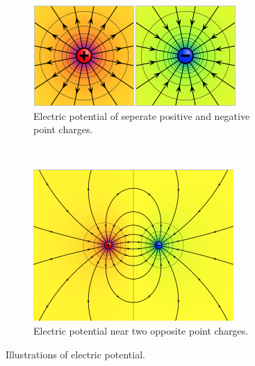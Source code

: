 \begin{figure}
	\centering
	\begin{subfigure}[b]{\linewidth}
		\centering
		\includegraphics[width=\linewidth]{Materials/wiki1}
		\caption{Electric potential of seperate positive and negative point charges.}
		\label{wiki1}
	\end{subfigure}
	\\
	\begin{subfigure}[b]{0.7\linewidth}
		\centering
		\includegraphics[width=\linewidth]{Materials/wiki2}
		\caption{Electric potential near two opposite point charges.}
		\label{wiki2}
	\end{subfigure}
	\caption{Illustrations of electric potential.}
	\label{wiki}
\end{figure}

